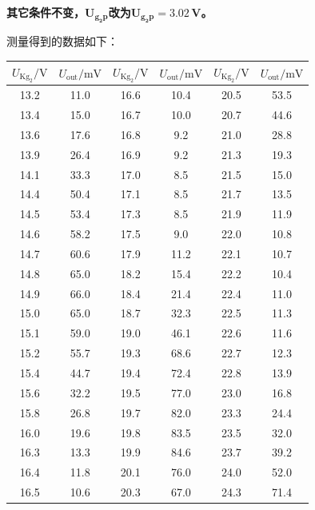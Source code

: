 \documentclass[a4paper,fontset=windows]{ctexart}
\begin{document}
    \textbf{其它条件不变，$\boldsymbol{U_{\mathbf{g_{2}p}}}$改为$\boldsymbol{U_{\mathbf{g_{2}p}} = 3.02\,\mathbf{V}}$。}

    测量得到的数据如下：
    \begin{center}\Large
        \begin{longtable}{ cccccc }
            \toprule[0.1em]
            $U_{\mathrm{Kg_2}}/\mathrm{V}$ & $U_{\mathrm{out}}/\mathrm{mV}$ & $U_{\mathrm{Kg_2}}/\mathrm{V}$ & $U_{\mathrm{out}}/\mathrm{mV}$ & $U_{\mathrm{Kg_2}}/\mathrm{V}$ & $U_{\mathrm{out}}/\mathrm{mV}$ \\
            \midrule[0.06em]
            13.2 & 11.0 & 16.6 & 10.4 & 20.5 & 53.5 \\
            13.4 & 15.0 & 16.7 & 10.0 & 20.7 & 44.6 \\
            13.6 & 17.6 & 16.8 & 9.2  & 21.0 & 28.8 \\
            13.9 & 26.4 & 16.9 & 9.2  & 21.3 & 19.3 \\
            14.1 & 33.3 & 17.0 & 8.5  & 21.5 & 15.0 \\
            14.4 & 50.4 & 17.1 & 8.5  & 21.7 & 13.5 \\
            14.5 & 53.4 & 17.3 & 8.5  & 21.9 & 11.9 \\
            14.6 & 58.2 & 17.5 & 9.0  & 22.0 & 10.8 \\
            14.7 & 60.6 & 17.9 & 11.2 & 22.1 & 10.7 \\
            14.8 & 65.0 & 18.2 & 15.4 & 22.2 & 10.4 \\
            14.9 & 66.0 & 18.4 & 21.4 & 22.4 & 11.0 \\
            15.0 & 65.0 & 18.7 & 32.3 & 22.5 & 11.3 \\
            15.1 & 59.0 & 19.0 & 46.1 & 22.6 & 11.6 \\
            15.2 & 55.7 & 19.3 & 68.6 & 22.7 & 12.3 \\
            15.4 & 44.7 & 19.4 & 72.4 & 22.8 & 13.9 \\
            15.6 & 32.2 & 19.5 & 77.0 & 23.0 & 16.8 \\
            15.8 & 26.8 & 19.7 & 82.0 & 23.3 & 24.4 \\
            16.0 & 19.6 & 19.8 & 83.5 & 23.5 & 32.0 \\
            16.3 & 13.3 & 19.9 & 84.6 & 23.7 & 39.2 \\
            16.4 & 11.8 & 20.1 & 76.0 & 24.0 & 52.0 \\
            16.5 & 10.6 & 20.3 & 67.0 & 24.3 & 71.4 \\
            \bottomrule[0.1em]
        \end{longtable}
    \end{center}
\end{document}
